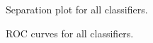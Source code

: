 \documentclass{article}
\begin{document}
\begin{figure}[H]
    \caption{Separation plot for all classifiers.}
\label{fig:separation}
\end{figure}

\begin{figure}[H]
    \caption{ROC curves for all classifiers.}
\label{fig:ROC}
\end{figure}
\end{document}

